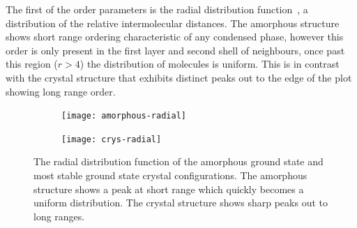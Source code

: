 The first of the order parameters is the radial distribution function~, a distribution of the relative intermolecular distances. The amorphous structure shows short range ordering characteristic of any condensed phase, however this order is only present in the first layer and second shell of neighbours, once past this region ($r>4$) the distribution of molecules is uniform. This is in contrast with the crystal structure that exhibits distinct peaks out to the edge of the plot showing long range order.

\begin{figure}
    \begin{subfigure}{0.5\textwidth}
        \texttt{[image: amorphous-radial]}
        \caption{}
        \label{fig:amorphous radial}
    \end{subfigure}
    \begin{subfigure}{0.5\textwidth}
        \texttt{[image: crys-radial]}
        \caption{}
        \label{fig:crys radial}
    \end{subfigure}
    \caption{The radial distribution function of the amorphous ground state  and most stable ground state crystal  configurations. The amorphous structure shows a peak at short range which quickly becomes a uniform distribution. The crystal structure shows sharp peaks out to long ranges.}
    \label{fig:frame comp}
\end{figure}

